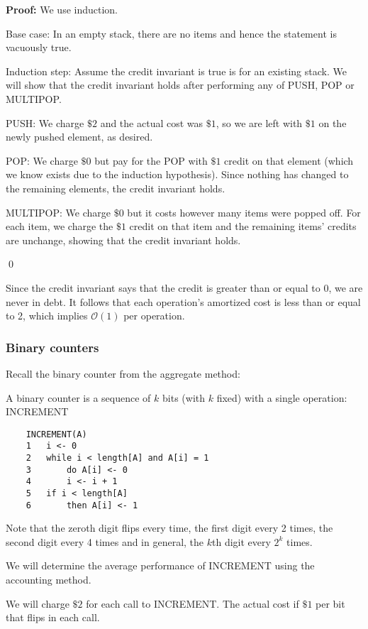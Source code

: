 \documentclass[11pt]{article}
\begin{document}
\textbf{Proof:} We use induction. 

Base case: In an empty stack, there are no items and hence the statement is vacuously true. 

Induction step: Assume the credit invariant is true is for an existing stack. We will show that the credit invariant holds after performing any of PUSH, POP or MULTIPOP. 

PUSH: We charge $\$2$ and the actual cost was $\$ 1$, so we are left with $\$1$ on the newly pushed element, as desired. 

POP: We charge $\$0$ but pay for the POP with $\$1$ credit on that element (which we know exists due to the induction hypothesis). Since nothing has changed to the remaining elements, the credit invariant holds. 

MULTIPOP: We charge $\$0$ but it costs however many items were popped off. For each item, we charge the $\$ 1$ credit on that item and the remaining items' credits are unchange, showing that the credit invariant holds. 

\qed 

Since the credit invariant says that the credit is greater than or equal to 0, we are never in debt. It follows that each operation's amortized cost is less than or equal to 2, which implies $\mathcal{O}(1)$ per operation. 

\subsubsection{Binary counters} 
Recall the binary counter from the aggregate method: 

A binary counter is a sequence of $k$ bits (with $k$ fixed) with a single operation: INCREMENT
\begin{verbatim}
    INCREMENT(A)
    1   i <- 0 
    2   while i < length[A] and A[i] = 1
    3       do A[i] <- 0 
    4       i <- i + 1
    5   if i < length[A]
    6       then A[i] <- 1
\end{verbatim}

Note that the zeroth digit flips every time, the first digit every 2 times, the second digit every 4 times and in general, the $k$th digit every $2^{k}$ times.

We will determine the average performance of INCREMENT using the accounting method. 

We will charge $\$ 2$ for each call to INCREMENT. The actual cost if $\$ 1$ per bit that flips in each call. 
\end{document}
